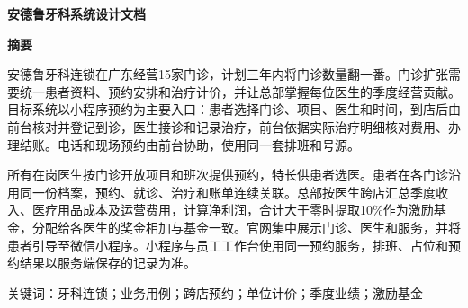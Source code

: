 \documentclass[UTF8,12pt,a4paper,fontset=none]{ctexart}
\begin{document}
\begin{center}{\sffamily\bfseries\fontsize{18pt}{26pt}\selectfont 安德鲁牙科系统设计文档\par}\end{center}
\begin{center}{\sffamily\bfseries\large 摘\quad 要}\end{center}
\noindent\hspace*{2em}安德鲁牙科连锁在广东经营15家门诊，计划三年内将门诊数量翻一番。门诊扩张需要统一患者资料、预约安排和治疗计价，并让总部掌握每位医生的季度经营贡献。目标系统以小程序预约为主要入口：患者选择门诊、项目、医生和时间，到店后由前台核对并登记到诊，医生接诊和记录治疗，前台依据实际治疗明细核对费用、办理结账。电话和现场预约由前台协助，使用同一套排班和号源。\par
所有在岗医生按门诊开放项目和班次提供预约，特长供患者选医。患者在各门诊沿用同一份档案，预约、就诊、治疗和账单连续关联。总部按医生跨店汇总季度收入、医疗用品成本及运营费用，计算净利润，合计大于零时提取10\%作为激励基金，分配给各医生的奖金相加与基金一致。官网集中展示门诊、医生和服务，并将患者引导至微信小程序。小程序与员工工作台使用同一预约服务，排班、占位和预约结果以服务端保存的记录为准。\par
关键词：牙科连锁；业务用例；跨店预约；单位计价；季度业绩；激励基金\par
\Needspace{459pt}
\end{document}
